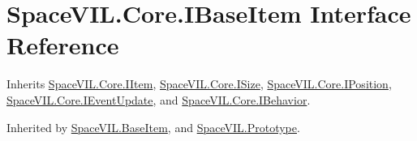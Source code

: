 \hypertarget{interface_space_v_i_l_1_1_core_1_1_i_base_item}{}\section{Space\+V\+I\+L.\+Core.\+I\+Base\+Item Interface Reference}
\label{interface_space_v_i_l_1_1_core_1_1_i_base_item}


Inherits \mbox{\hyperlink{interface_space_v_i_l_1_1_core_1_1_i_item}{Space\+V\+I\+L.\+Core.\+I\+Item}}, \mbox{\hyperlink{interface_space_v_i_l_1_1_core_1_1_i_size}{Space\+V\+I\+L.\+Core.\+I\+Size}}, \mbox{\hyperlink{interface_space_v_i_l_1_1_core_1_1_i_position}{Space\+V\+I\+L.\+Core.\+I\+Position}}, \mbox{\hyperlink{interface_space_v_i_l_1_1_core_1_1_i_event_update}{Space\+V\+I\+L.\+Core.\+I\+Event\+Update}}, and \mbox{\hyperlink{interface_space_v_i_l_1_1_core_1_1_i_behavior}{Space\+V\+I\+L.\+Core.\+I\+Behavior}}.



Inherited by \mbox{\hyperlink{class_space_v_i_l_1_1_base_item}{Space\+V\+I\+L.\+Base\+Item}}, and \mbox{\hyperlink{class_space_v_i_l_1_1_prototype}{Space\+V\+I\+L.\+Prototype}}.

